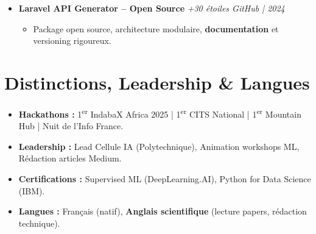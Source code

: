 \documentclass[a4paper,11pt]{article}
\begin{document}
\begin{itemize}[leftmargin=*, label={-}]
\item \textbf{Laravel API Generator -- Open Source} \hfill \textit{+30 étoiles GitHub | 2024}
\vspace{-2pt}
    \begin{itemize}[leftmargin=0.4cm, nosep, label=\tiny$\bullet$]
        \item \small{Package open source, architecture modulaire, \textbf{documentation} et versioning rigoureux.}
    \end{itemize}

\end{itemize}

\section{Distinctions, Leadership \& Langues}
\begin{itemize}[leftmargin=*, nosep]
    \item \textbf{Hackathons :} 1\textsuperscript{er} IndabaX Africa 2025 | 1\textsuperscript{er} CITS National | 1\textsuperscript{er} Mountain Hub | Nuit de l'Info France.
    \item \textbf{Leadership :} Lead Cellule IA (Polytechnique), Animation workshops ML, Rédaction articles Medium.
    \item \textbf{Certifications :} Supervised ML (DeepLearning.AI), Python for Data Science (IBM).
    \item \textbf{Langues :} Français (natif), \textbf{Anglais scientifique} (lecture papers, rédaction technique).
\end{itemize}
\end{document}
